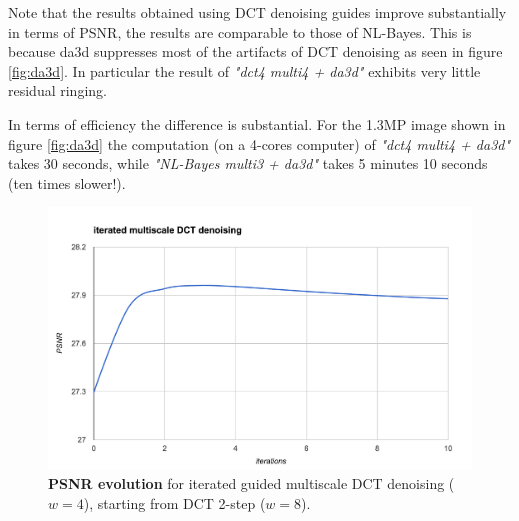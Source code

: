 \documentclass{ipol}
\begin{document}
Note that the results obtained using DCT denoising guides improve substantially in terms of PSNR, the results are comparable to those of NL-Bayes. This is because da3d suppresses most of the artifacts of DCT denoising as seen in figure \ref{fig:da3d}. 
In particular the result of \emph{"dct4 multi4 + da3d"} exhibits very little residual ringing.

In terms of efficiency the difference is substantial. For the  1.3MP image shown in figure \ref{fig:da3d} the computation (on a 4-cores computer) of \emph{"dct4 multi4 + da3d"} takes 30 seconds, while \emph{"NL-Bayes multi3 + da3d"} takes 5 minutes 10 seconds (ten times slower!). 



\begin{figure}[htbp]
\begin{center}
\includegraphics[width = .9\textwidth]{f/graphPSNR_dct4_multi_iter} 
\caption{{\bf PSNR evolution} for iterated guided multiscale DCT denoising ($w=4$), starting from DCT 2-step ($w=8$).}
\label{fig:psnr_iter}
\end{center}
\end{figure}
\end{document}
